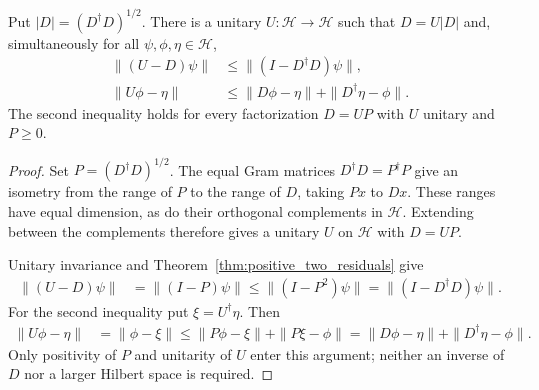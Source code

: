 \begin{theorem}
    \label{thm:unitary_polar_correction}
    \leanok
    Put $|D|=(D^\dagger D)^{1/2}$. There is a unitary
    $U:\mathcal H\to\mathcal H$ such that $D=U|D|$ and,
    simultaneously for all $\psi,\phi,\eta\in\mathcal H$,
    \begin{align}
        \|(U-D)\psi\|  & \le\|(I-D^\dagger D)\psi\|,               \\
        \|U\phi-\eta\| & \le\|D\phi-\eta\|+\|D^\dagger\eta-\phi\|.
    \end{align}
    The second inequality holds for every factorization $D=UP$ with $U$
    unitary and $P\ge0$.
\end{theorem}
\begin{proof}
    \leanok
    Set $P=(D^\dagger D)^{1/2}$. The equal Gram matrices
    $D^\dagger D=P^\dagger P$ give an isometry from the range of $P$ to
    the range of $D$, taking $Px$ to $Dx$. These ranges have equal
    dimension, as do their orthogonal complements in $\mathcal H$.
    Extending between the complements therefore gives a unitary $U$ on
    $\mathcal H$ with $D=UP$.

    Unitary invariance and Theorem~\ref{thm:positive_two_residuals} give
    \begin{align}
        \|(U-D)\psi\| & =\|(I-P)\psi\|
        \le\|(I-P^2)\psi\|=\|(I-D^\dagger D)\psi\|.
    \end{align}
    For the second inequality put $\xi=U^\dagger\eta$. Then
    \begin{align}
        \|U\phi-\eta\| & =\|\phi-\xi\|
        \le\|P\phi-\xi\|+\|P\xi-\phi\|
        =\|D\phi-\eta\|+\|D^\dagger\eta-\phi\|.
    \end{align}
    Only positivity of $P$ and unitarity of $U$ enter this argument;
    neither an inverse of $D$ nor a larger Hilbert space is required.
\end{proof}

